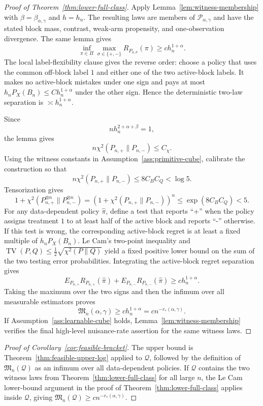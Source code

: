 \documentclass[11pt]{article}
\theoremstyle{definition}
\theoremstyle{plain}
\theoremstyle{remark}
\begin{document}
\begin{proof}[Proof of Theorem~\ref{thm:lower-full-class}]
Apply Lemma~\ref{lem:witness-membership} with
\(\beta=\beta_{\alpha,\gamma}\) and \(h=h_n\).  The resulting laws are
members of \(\mathcal P_{\alpha,\gamma}\) and have the stated block mass,
contrast, weak-arm propensity, and one-observation divergence.  The same
lemma gives
\[
\inf_{\pi\in\Pi}\max_{\sigma\in\{+,-\}}R_{P_{n,\sigma}}(\pi)
\ge c h_n^{1+\alpha}.
\]
The local label-flexibility clause gives the reverse order: choose a policy
that uses the common off-block label \(1\) and either one of the two
active-block labels.  It makes no active-block mistakes under one sign and
pays at most \(h_nP_X(B_n)\le C h_n^{1+\alpha}\) under the other sign.  Hence
the deterministic two-law separation is \(\asymp h_n^{1+\alpha}\).

Since
\[
n h_n^{2+\alpha+\beta}=1,
\]
the lemma gives
\[
n\chi^2(P_{n,+}\|P_{n,-})\le C_\chi.
\]
Using the witness constants in Assumption~\ref{ass:primitive-cube}, calibrate
the construction so that
\[
n\chi^2(P_{n,+}\|P_{n,-})\le 8C_BC_Q<\log 5.
\]
Tensorization gives
\[
1+\chi^2(P_{n,+}^{\otimes n}\|P_{n,-}^{\otimes n})
=(1+\chi^2(P_{n,+}\|P_{n,-}))^n
\le \exp(8C_BC_Q)<5.
\]
For any data-dependent policy \(\widehat\pi\), define a test that reports
``+'' when the policy assigns treatment \(1\) to at least half of the active
block and reports ``-'' otherwise.  If this test is wrong, the corresponding
active-block regret is at least a fixed multiple of \(h_nP_X(B_n)\).  Le
Cam's two-point inequality and
\(\operatorname{TV}(P,Q)\le\tfrac12\sqrt{\chi^2(P\|Q)}\) yield a fixed
positive lower bound on the sum of the two testing error probabilities.
Integrating the active-block regret separation gives
\[
E_{P_{n,+}}R_{P_{n,+}}(\widehat\pi)
+E_{P_{n,-}}R_{P_{n,-}}(\widehat\pi)
\ge c h_n^{1+\alpha}.
\]
Taking the maximum over the two signs and then the infimum over all
measurable estimators proves
\[
\mathfrak M_n(\alpha,\gamma)\ge c h_n^{1+\alpha}
=c n^{-r_*(\alpha,\gamma)}.
\]
If Assumption~\ref{ass:learnable-cube} holds,
Lemma~\ref{lem:witness-membership} verifies the final high-level
nuisance-rate assertion for the same witness laws.
\end{proof}

\begin{proof}[Proof of Corollary~\ref{cor:feasible-bracket}]
The upper bound is Theorem~\ref{thm:feasible-upper-log} applied to
\(\mathcal Q\), followed by the definition of \(\mathfrak M_n(\mathcal Q)\)
as an infimum over all data-dependent policies.  If \(\mathcal Q\) contains
the two witness laws from Theorem~\ref{thm:lower-full-class} for all large
\(n\), the Le Cam lower-bound argument in the proof of
Theorem~\ref{thm:lower-full-class} applies inside \(\mathcal Q\), giving
\(\mathfrak M_n(\mathcal Q)\ge c n^{-r_*(\alpha,\gamma)}\).
\end{proof}
\end{document}

